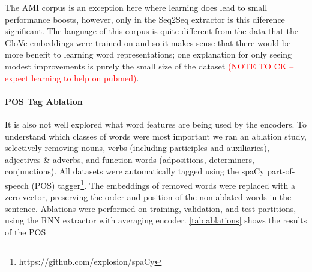 The AMI corpus is an exception here where learning does lead to small
performance boosts, however, only in the Seq2Seq extractor is this diference 
significant. The language of this corpus is quite different from the 
data that the GloVe embeddings were trained on and so it makes sense 
that  there would be more benefit to learning word representations; one
explanation for only seeing modest improvements is purely the small size
of the dataset \textcolor{red}{(NOTE TO CK -- expect learning to help on pubmed)}. 


\paragraph{POS Tag Ablation}
It is also not well explored what word features are being used by the encoders.
To understand which classes of words were most important we ran an ablation
study, selectively removing nouns, verbs 
(including participles and auxiliaries), adjectives \& adverbs, and 
function words (adpositions, determiners, conjunctions).
All datasets were automatically tagged using
the spaCy part-of-speech (POS)
tagger\footnote{https://github.com/explosion/spaCy}.   
The embeddings of removed words were replaced with a zero vector,
preserving the order and position of the non-ablated words in the sentence.
Ablations were performed on training, validation, and test partitions,
using the RNN extractor with averaging encoder.
\autoref{tab:ablations} shows the results of the POS
